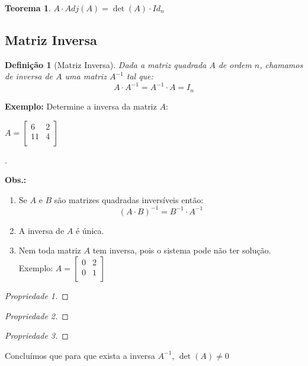 \documentclass[oneside,a4paper,12pt]{article}
\newtheorem{theorem}{Teorema}[section]
\newtheorem{definition}{Definição}[section]
\newtheorem{proof}{Demonstração}
\begin{document}
\begin{theorem}
	$A \cdot Adj(A) = \det(A) \cdot Id_n$
\end{theorem}

\subsection{Matriz Inversa}

\begin{definition}[Matriz Inversa]
Dada a matriz quadrada $A$ de ordem $n$, chamamos de inversa de $A$ uma matriz $A^{-1}$ tal que:
$$A\cdot A^{-1} = A^{-1} \cdot A = I_n$$
\end{definition}

\textbf{Exemplo: } Determine a inversa da matriz $A$:

$A=\left[
\begin{array}{cc}
	6	&	2	\\
	11	&	4	\\
\end{array}
\right]
$

\newpage
.
\vspace{100pt}

\textbf{Obs.:}
\begin{enumerate}
	\item Se $A$ e $B$ são matrizes quadradas inversíveis então: $$(A \cdot B)^{-1} = B^{-1} \cdot A^{-1}$$
	\item A inversa de $A$ é única.
	\item Nem toda matriz $A$ tem inversa, pois o sistema pode não ter solução. \\ Exemplo: $A=\left[
	\begin{array}{cc}
	0	&	2	\\
	0	&	1	\\
	\end{array}
	\right]
	$
\end{enumerate}

\begin{proof}[Propriedade 1]
	\vspace{100pt}
\end{proof}
\begin{proof}[Propriedade 2]
	\vspace{100pt}
\end{proof}
\begin{proof}[Propriedade 3]
	\vspace{100pt}	
\end{proof}

Concluímos que para que exista a inversa $A^{-1}$, $\det(A) \neq 0$
\end{document}
